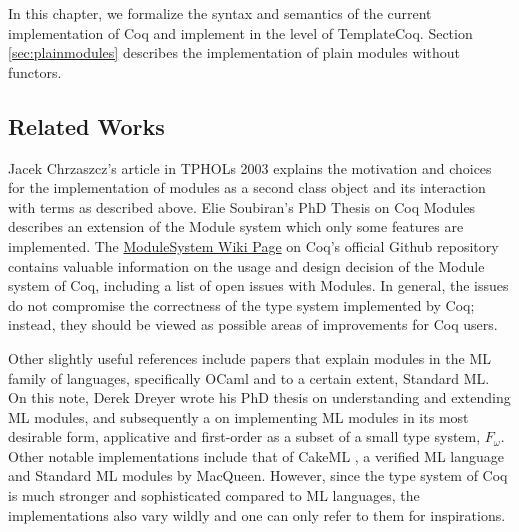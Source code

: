 In this chapter, we formalize the syntax and semantics of the current
implementation of Coq and implement in the level of TemplateCoq. Section
\ref{sec:plainmodules} describes the implementation of plain modules
without functors.


\subsection{Related Works} Jacek Chrzaszcz's article in TPHOLs 2003
 explains the motivation and choices for the implementation
of modules as a second class object and its interaction with terms as described
above.  Elie Soubiran's PhD Thesis on Coq Modules  describes
an extension of the Module system which only some features are implemented. The
\href{https://github.com/coq/coq/wiki/ModuleSystem}{ModuleSystem Wiki Page} on
Coq's official Github repository contains valuable information on the usage and
design decision of the Module system of Coq, including a list of open issues 
with Modules. In general, the issues do not compromise the correctness of the
type system implemented by Coq; instead, they should be viewed as possible areas
of improvements for Coq users.

Other slightly useful references include papers that explain modules in the ML
family of languages, specifically OCaml and to a certain extent, Standard ML.
On this note, Derek Dreyer wrote his PhD thesis  on
understanding and extending ML modules, and subsequently a on implementing ML
modules in its most desirable form, applicative and first-order as a subset of a
small type system, $F_\omega$. Other notable implementations
include that of CakeML , a verified ML language and Standard ML
modules by MacQueen. However, since the type
system of Coq is much stronger and sophisticated compared to ML languages, the
implementations also vary wildly and one can only refer to them for
inspirations.


